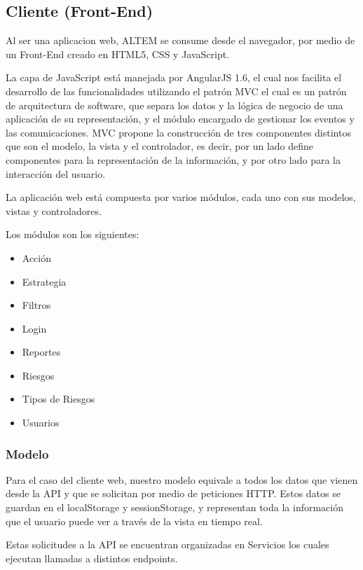 \subsection{Cliente (Front-End)}
Al ser una aplicacion web, ALTEM se consume desde el navegador, por medio de un Front-End creado en HTML5, CSS y JavaScript.

La capa de JavaScript está manejada por AngularJS 1.6, el cual nos facilita el desarrollo de las funcionalidades utilizando el patrón MVC el cual es un patrón de arquitectura de software, que separa los datos y la lógica de negocio de una aplicación de su representación, y el módulo encargado de gestionar los eventos y las comunicaciones.
MVC propone la construcción de tres componentes distintos que son el modelo, la vista y el controlador, es decir, por un lado define componentes para la representación de la información, y por otro lado para la interacción del usuario.\cite{trygve}

La aplicación web está compuesta por varios módulos, cada uno con sus modelos, vistas y controladores.

Los módulos son los siguientes:

\begin{itemize}
    \item Acción
    \item Estrategia
    \item Filtros
    \item Login
    \item Reportes
    \item Riesgos
    \item Tipos de Riesgos
    \item Usuarios
\end{itemize}

\subsubsection{Modelo}
Para el caso del cliente web, nuestro modelo equivale a todos los datos que vienen desde la API y que se solicitan por medio de peticiones HTTP. Estos datos se guardan en el localStorage y sessionStorage, y representan toda la información que el usuario puede ver a través de la vista en tiempo real.

Estas solicitudes a la API se encuentran organizadas en Servicios\cite{servicios} los cuales ejecutan llamadas a distintos endpoints\cite{endpoints}.

